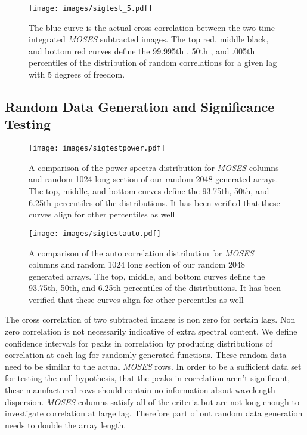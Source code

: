 \documentclass[]{aastex6}
\begin{document}
\begin{figure*}[t]
\centering
\texttt{[image: images/sigtest\_5.pdf]}
\caption{The blue curve is the actual cross correlation between the two time integrated \textit{MOSES} subtracted images.  The top red, middle black, and bottom red curves define the 99.995th , 50th , and .005th percentiles of the distribution of random correlations for a given lag with 5 degrees of freedom.}
\end{figure*}	


\subsection{Random Data Generation and Significance Testing}

\begin{figure*}[t]
\centering
\texttt{[image: images/sigtestpower.pdf]}
\caption{A comparison of the power spectra distribution for \textit{MOSES} columns and random 1024 long section of our random 2048 generated arrays.  The top, middle, and bottom curves define the 93.75th, 50th, and 6.25th percentiles of the distributions.  It has been verified that these curves align for other percentiles as well}
\end{figure*}	


\begin{figure*}[t]
\centering
\texttt{[image: images/sigtestauto.pdf]}
\caption{A comparison of the auto correlation distribution for \textit{MOSES} columns and random 1024 long section of our random 2048 generated arrays.  The top, middle, and bottom curves define the 93.75th, 50th, and 6.25th percentiles of the distributions.  It has been verified that these curves align for other percentiles as well}
\end{figure*}	

The cross correlation of two subtracted images is non zero for certain lags. Non zero correlation is not necessarily indicative of extra spectral content.   We define confidence intervals for peaks in correlation by producing distributions of correlation at each lag for randomly generated functions.  These random data need to be similar to the actual \textit{MOSES} rows. In order to be a sufficient data set for testing the null hypothesis, that the peaks in correlation aren't significant, these manufactured rows should contain no information about wavelength dispersion.  \textit{MOSES} columns satisfy all of the criteria but are not long enough to investigate correlation at large lag. Therefore part of out random data generation needs to double the array length.
\end{document}
